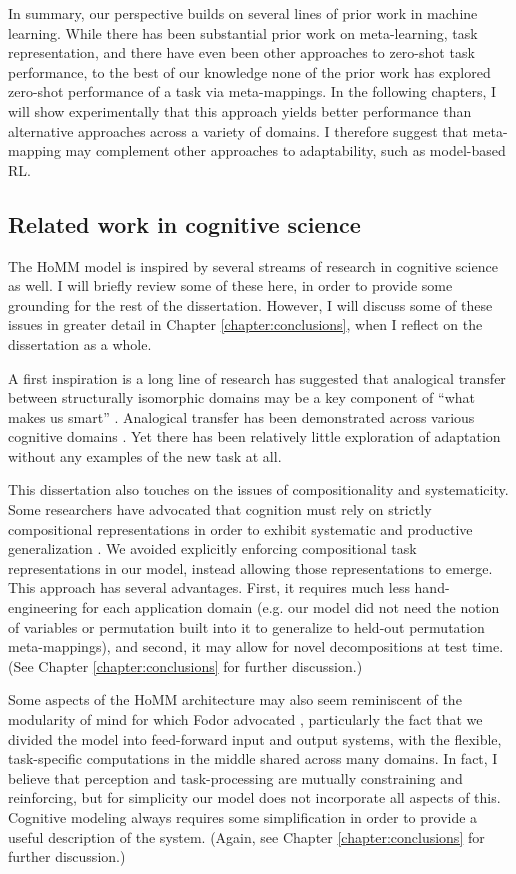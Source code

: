 In summary, our perspective builds on several lines of prior work in machine learning. While there has been substantial prior work on meta-learning, task representation, and there have even been other approaches to zero-shot task performance, to the best of our knowledge none of the prior work has explored zero-shot performance of a task via meta-mappings. In the following chapters, I will show experimentally that this approach yields better performance than alternative approaches across a variety of domains. I therefore suggest that meta-mapping may complement other approaches to adaptability, such as model-based RL.

\subsection{Related work in cognitive science}
The HoMM model is inspired by several streams of research in cognitive science as well. I will briefly review some of these here, in order to provide some grounding for the rest of the dissertation. However, I will discuss some of these issues in greater detail in Chapter \ref{chapter:conclusions}, when I reflect on the dissertation as a whole.   

A first inspiration is a long line of research has suggested that analogical transfer between structurally isomorphic domains may be a key component of ``what makes us smart'' \citep{Gentner2003}. Analogical transfer has been demonstrated across various cognitive domains \citep[e.g.][]{Bourne1970, Day2011}. Yet there has been relatively little exploration of adaptation without any examples of the new task at all. 

This dissertation also touches on the issues of compositionality and systematicity. Some researchers have advocated that cognition must rely on strictly compositional representations in order to exhibit systematic and productive generalization \citep[e.g.][]{Fodor2001,Lake2017}.  We avoided explicitly enforcing compositional task representations in our model, instead allowing those representations to emerge. This approach has several advantages. First, it requires much less hand-engineering for each application domain (e.g. our model did not need the notion of variables or permutation built into it to generalize to held-out permutation meta-mappings), and second, it may allow for novel decompositions at test time. (See Chapter \ref{chapter:conclusions} for further discussion.) 

Some aspects of the HoMM architecture may also seem reminiscent of the modularity of mind for which Fodor advocated \citep{Fodor1983modularity}, particularly the fact that we divided the model into feed-forward input and output systems, with the flexible, task-specific computations in the middle shared across many domains. In fact, I believe that perception and task-processing are mutually constraining and reinforcing, but for simplicity our model does not incorporate all aspects of this. Cognitive modeling always requires some simplification in order to provide a useful description of the system. (Again, see Chapter \ref{chapter:conclusions} for further discussion.)   

